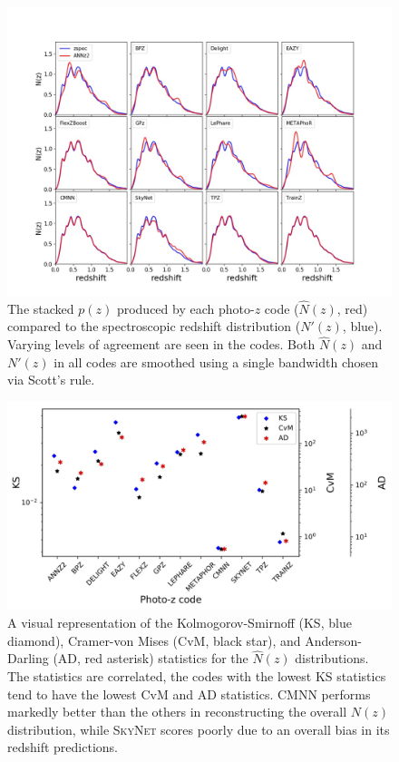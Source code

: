 \begin{figure}
\centering
\includegraphics[width=\textwidth]{fig/NZsumplot_12codes_scottsrule.jpg}
\caption{The stacked $p(z)$ produced by each photo-$z$ code ($\hat{N}(z)$, red) compared to the spectroscopic redshift distribution ($N'(z)$, blue).  Varying levels of agreement are seen in the codes.  Both $\hat{N}(z)$ and $N'(z)$ in all codes are smoothed using a single bandwidth chosen via Scott's rule.} \label{fig:nz}
\end{figure}

\begin{figure}
\centering
\includegraphics[width=\textwidth]{fig/KSvsCvMvsAD_NZ_withnull_jpg.jpg}
\caption{A visual representation of the Kolmogorov-Smirnoff (KS, blue diamond), Cramer-von Mises (CvM, black star), and Anderson-Darling (AD, red asterisk) statistics for the $\hat{N}(z)$ distributions. The statistics are correlated, the codes with the lowest KS statistics tend to have the lowest CvM and AD statistics.  \textsc{CMNN} performs markedly better than the others in reconstructing the overall $N(z)$ distribution, while \textsc{SkyNet} scores poorly due to an overall bias in its redshift predictions.} \label{fig:nz_stats}
\end{figure}

